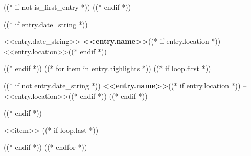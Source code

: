 ((* if not is_first_entry *))
\vspace{<<design.margins.entry_area.vertical_between>>}
((* endif *))

((* if entry.date_string *))
\begin{twocolentry}{
    <<entry.date_string>>
}
    \textbf{<<entry.name>>}((* if entry.location *)) -- <<entry.location>>((* endif *))
\end{twocolentry}

\vspace{<<design.margins.highlights_area.top>>}
((* endif *))
((* for item in entry.highlights *))
    ((* if loop.first *))
\begin{onecolentry}
        ((* if not entry.date_string *))
    \textbf{<<entry.name>>}((* if entry.location *)) -- <<entry.location>>((* endif *))
        ((* endif *))
    \begin{highlights}
    ((* endif *))
        \item <<item>>
    ((* if loop.last *))
    \end{highlights}
\end{onecolentry}
    ((* endif *))
((* endfor *))
